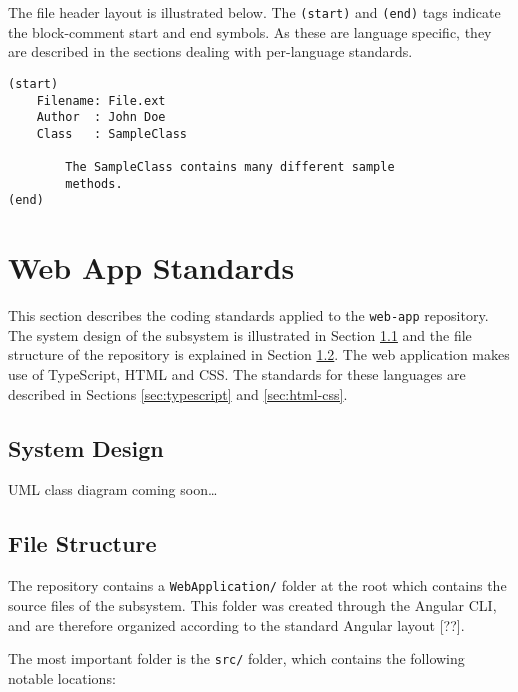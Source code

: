 \documentclass{article}
\begin{document}
    The file header layout is illustrated below. The \texttt{(start)} and
    \texttt{(end)} tags indicate the block-comment start and end symbols.
    As these are language specific, they are described in the sections
    dealing with per-language standards.

    \begin{lstlisting}
(start)
    Filename: File.ext
    Author  : John Doe
    Class   : SampleClass

        The SampleClass contains many different sample
        methods.
(end)
    \end{lstlisting}

    \newpage


    \section{Web App Standards}
    \label{sec:web-app}

    This section describes the coding standards applied to the \texttt{web-app}
    repository. The system design of the subsystem is illustrated in Section
    \ref{sec:wa-design} and the file structure of the repository is explained in
    Section \ref{sec:wa-struc}. The web application makes use of TypeScript,
    HTML and CSS. The standards for these languages are described in Sections
    \ref{sec:typescript} and \ref{sec:html-css}.

    \subsection{System Design}
    \label{sec:wa-design}

    UML class diagram coming soon\ldots

    \subsection{File Structure}
    \label{sec:wa-struc}

    The repository contains a \texttt{WebApplication/} folder at the root which
    contains the source files of the subsystem. This folder was created through
    the Angular CLI, and are therefore organized according to the standard
    Angular layout [??].

    The most important folder is the \texttt{src/} folder, which contains the
    following notable locations:
\end{document}
